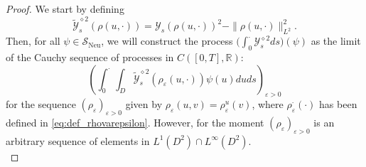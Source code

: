 \documentclass[a4paper, reqno, 12pt]{amsart}
\theoremstyle{plain}
\theoremstyle{definition}
\newcommand{\R}{\mathbb{R}}
\begin{document}
\begin{proof}
We start by defining 
    \begin{equation*}
        \tilde{\mathcal{Y}}^{\diamond 2}_s(\rho(u,\cdot)) = \mathcal{Y}_s(\rho(u,\cdot))^2 -\|\rho(u,\cdot)\|_{L^2}^2.  
    \end{equation*}
Then, for all $\psi\in \mathcal S_{\text{Neu}}$, we will construct the process $\big(\int_0^{\cdot}\mathcal{Y}^{\diamond 2}_s ds\big) (\psi)$ as the limit of the Cauchy sequence of processes in $C([0,T],\R)$:
    \begin{equation*}
       \left(  \int_0^{\cdot}\int_D\tilde{\mathcal{Y}}^{\diamond 2}_s(\rho_{\varepsilon}(u,\cdot))\psi(u) du ds \right)_{\varepsilon>0} 
    \end{equation*}
for the sequence $(\rho_\varepsilon)_{\varepsilon>0}$ given by  $\rho_\varepsilon (u,v)=\rho_\varepsilon^u (v)$, where $\rho_\varepsilon^\cdot(\cdot)$ has been defined in \eqref{eq:def_rhovarepsilon}. 
However, for the moment  $(\rho_{\varepsilon})_{\varepsilon>0}$ is an arbitrary sequence of elements in $L^1(D^2) \cap L^{\infty}(D^2)$.\\


\end{proof}
\end{document}
